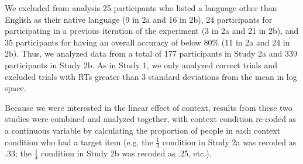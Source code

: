 \documentclass[10pt,letterpaper]{article}
\begin{document}
We excluded from analysis 25 participants who listed a language other than English as their native language (9 in 2a and 16 in 2b), 24 participants for participating in a previous iteration of the experiment (3 in 2a and 21 in 2b), and 35 participants for having an overall accuracy of below 80\% (11 in 2a and 24 in 2b).  Thus, we analyzed data from a total of 177 participants in Study 2a and 339 participants in Study 2b. As in Study 1, we only analyzed correct trials and excluded trials with RTs greater than 3 standard deviations from the mean in log space.  

Because we were interested in the linear effect of context, results from these two studies were combined and analyzed together, with context condition re-coded as a continuous variable by calculating the proportion of people in each context condition who had a target item (e.g. the $\frac{1}{3}$ condition in Study 2a was recoded as .33; the $\frac{1}{4}$ condition in Study 2b was recoded as .25, etc.). 
\end{document}
